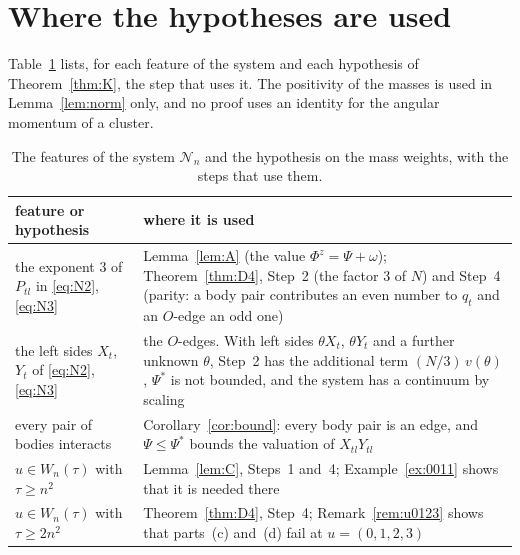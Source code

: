 \documentclass[11pt]{amsart}
\theoremstyle{definition}
\theoremstyle{remark}
\numberwithin{equation}{section}
\newcommand{\cN}{\mathcal{N}}
\newcommand{\Ps}{\Psi^{*}}
\begin{document}
\section{Where the hypotheses are used}\label{sec:hyp}

Table~\ref{tab:hyp} lists, for each feature of the system and each hypothesis of Theorem~\ref{thm:K}, the
step that uses it. The positivity of the masses is used in Lemma~\ref{lem:norm} only, and no proof uses an identity for the
angular momentum of a cluster.

\begin{table}[ht]
\caption{The features of the system $\cN_n$ and the hypothesis on the mass weights, with the steps that
use them.}\label{tab:hyp}
\small
\begin{tabular}{@{}>{\raggedright}p{}>{\raggedright\arraybackslash}p{}@{}}
\toprule
feature or hypothesis & where it is used \\
\midrule
the exponent $3$ of $P_{tl}$ in \eqref{eq:N2}, \eqref{eq:N3} & Lemma~\ref{lem:A} (the value $\Phi^z = \Psi + \omega$); Theorem~\ref{thm:D4}, Step~2 (the factor $3$ of $N$) and Step~4 (parity: a body pair contributes an even number to $q_t$ and an $O$-edge an odd one) \\
the left sides $X_t$, $Y_t$ of \eqref{eq:N2}, \eqref{eq:N3} & the $O$-edges. With left sides $\theta X_t$, $\theta Y_t$ and a further unknown $\theta$, Step~2 has the additional term $(N/3)\, v(\theta)$, $\Ps$ is not bounded, and the system has a continuum by scaling \\
every pair of bodies interacts & Corollary~\ref{cor:bound}: every body pair is an edge, and $\Psi \le \Ps$ bounds the valuation of $X_{tl} Y_{tl}$ \\
$u \in W_n(\tau)$ with $\tau \ge n^2$ & Lemma~\ref{lem:C}, Steps~1 and~4; Example~\ref{ex:0011} shows that it is needed there \\
$u \in W_n(\tau)$ with $\tau \ge 2n^2$ & Theorem~\ref{thm:D4}, Step~4; Remark~\ref{rem:u0123} shows that parts~(c) and~(d) fail at $u = (0, 1, 2, 3)$ \\
\bottomrule
\end{tabular}
\end{table}
\end{document}

